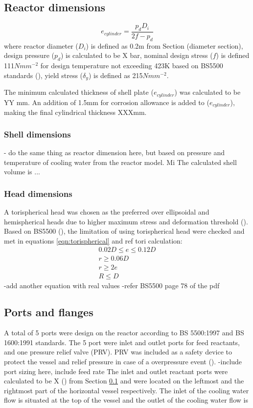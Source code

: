 \subsection{Reactor dimensions}
\label{sec:reactordimensions}

\begin{equation}
    e_{cylinder} = \frac{p_dD_i}{2f-p_d}
    \label{eqn:minthicknessreactor}
\end{equation}
where reactor diameter ($D_i$) is defined as 0.2m from Section (diameter section), design pressure ($p_d$) is calculated to be X bar, nominal design stress ($f$) is defined 111$Nmm^{-2}$ for design temperature not exceeding 423K based on BS5500 standards (), yield stress ($\delta_y$) is defined as 215$Nmm^{-2}$. 

The minimum calculated thickness of shell plate ($e_{cylinder}$) was calculated to be YY mm. An addition of 1.5mm for corrosion allowance is added to ($e_{cylinder}$), making the final cylindrical thickness XXXmm.
\subsubsection{Shell dimensions}
- do the same thing as reactor dimension here, but based on pressure and temperature of cooling water from the reactor model. Mi
The calculated shell volume is ...
\subsubsection{Head dimensions}
A torispherical head was chosen as the preferred over ellipsoidal and hemispherical heads due to higher maximum stress and deformation threshold (). 
Based on BS5500 (), the limitation of using torispherical head were checked and met in equations \ref{eqn:torispherical} and ref tori calculation:
\begin{equation}
    \begin{split}
        0.02D \leq e \leq 0.12D \\
        r \geq 0.06D \\
        r \geq 2e \\
        R \leq D
    \end{split}
    \label{eqn:torispherical}
\end{equation}
-add another equation with real values
-refer BS5500 page 78 of the pdf
\subsection{Ports and flanges}
A total of 5 ports were design on the reactor according to BS 5500:1997 and BS 1600:1991 standards. The 5 port were inlet and outlet ports for feed reactants, and one pressure relief valve (PRV). PRV was included as a safety device to protect the vessel and relief pressure in case of a overpressure event (). 
-include port sizing here, include feed rate
The inlet and outlet reactant ports were calculated to be X () from Section \ref{sec:reactordimensions} and were located on the leftmost and the rightmost part of the horizontal vessel respectively. 
The inlet of the cooling water flow is situated at the top of the vessel and the outlet of the cooling water flow is 

